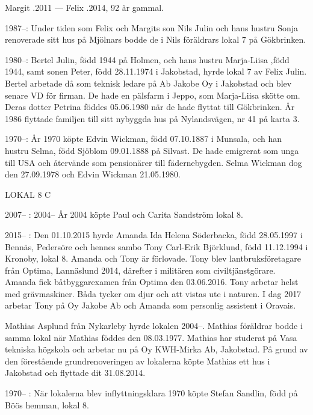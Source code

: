 Margit .2011  ---  Felix .2014, 92 år gammal.


1987--:	Under tiden som Felix och Margits son Nils Julin och hans hustru Sonja renoverade sitt hus på Mjölnars bodde de i Nils föräldrars lokal 7 på Gökbrinken.

1980--:	Bertel Julin, född 1944 på Holmen, och hans hustru Marja-Liisa ,född 1944, samt sonen Peter, född 28.11.1974 i Jakobstad, hyrde lokal 7 av Felix Julin. Bertel arbetade då som teknisk ledare på Ab Jakobe Oy i Jakobstad och blev senare VD för firman. De hade en pälsfarm i Jeppo, som Marja-Liisa skötte om. Deras dotter Petrina föddes 05.06.1980 när de hade flyttat till Gökbrinken. År 1986 flyttade familjen till sitt nybyggda hus på Nylandsvägen, nr 41 på karta 3.

 1970--:
År 1970 köpte Edvin Wickman, född 07.10.1887 i Munsala, och han hustru Selma, född Sjöblom 09.01.1888 på Silvast. De hade emigrerat som unga till USA och återvände som pensionärer till fädernebygden. Selma Wickman dog den 27.09.1978 och Edvin Wickman 21.05.1980.


LOKAL 8 C

 2007-- :
 2004--
År 2004 köpte Paul och Carita Sandström lokal 8.

	2015-- :
Den 01.10.2015 hyrde Amanda Ida Helena Söderbacka, född 28.05.1997 i Bennäs, Pedersöre och hennes sambo Tony Carl-Erik Björklund, född 11.12.1994 i Kronoby, lokal 8. Amanda och Tony är förlovade. Tony blev lantbruksföretagare från Optima, Lannäslund 2014, därefter i militären som civiltjänstgörare. Amanda fick båtbyggarexamen från Optima den 03.06.2016. Tony arbetar helst med grävmaskiner. Båda tycker om djur och att vistas ute i naturen. I dag 2017 arbetar Tony på Oy Jakobe Ab och Amanda som personlig assistent i Oravais.

Mathias Asplund från Nykarleby hyrde lokalen 2004--. Mathias föräldrar bodde i samma lokal när Mathias föddes den 08.03.1977. Mathias har studerat på Vasa tekniska högskola och arbetar nu på Oy KWH-Mirka Ab, Jakobstad. På grund av den förestående grundrenoveringen av lokalerna köpte Mathias ett hus i Jakobstad och flyttade dit 31.08.2014.

 1970-- :
När lokalerna blev inflyttningsklara 1970 köpte Stefan Sandlin, född på Böös hemman, lokal 8.

